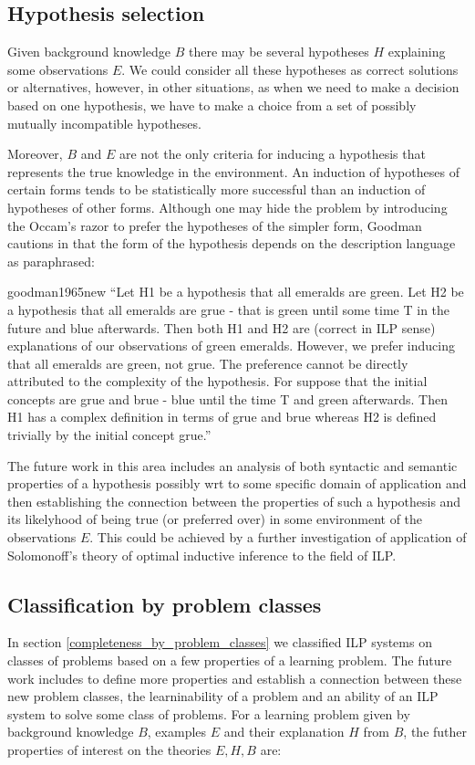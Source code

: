 \subsection{Hypothesis selection}
Given background knowledge $B$ there may be several hypotheses $H$ explaining some observations $E$. We could consider all these hypotheses as correct solutions or alternatives, however, in other situations, as when we need to make a decision based on one hypothesis, we have to make a choice from a set of possibly mutually incompatible hypotheses.

Moreover, $B$ and $E$ are not the only criteria for inducing a hypothesis that represents the true knowledge in the environment.
An induction of hypotheses of certain forms tends to be statistically more successful than an induction of hypotheses of other forms.
Although one may hide the problem by introducing the Occam's razor to prefer the hypotheses of the simpler form, Goodman cautions in \cite{goodman1965new} that the form of the hypothesis depends on the description language as paraphrased:

\begin{cite}{goodman1965new}
``Let H1 be a hypothesis that all emeralds are green. Let H2 be a hypothesis that all emeralds are grue - that is green until some time T in the future and blue afterwards. Then both H1 and H2 are (correct in ILP sense) explanations of our observations of green emeralds. However, we prefer inducing that all emeralds are green, not grue. The preference cannot be directly attributed to the complexity of the hypothesis. For suppose that the initial concepts are grue and brue - blue until the time T and green afterwards. Then H1 has a complex definition in terms of grue and brue whereas H2 is defined trivially by the initial concept grue.''
\end{cite}

The future work in this area includes an analysis of both syntactic and semantic properties of a hypothesis possibly wrt to some specific domain of application and then establishing the connection between the properties of such a hypothesis and its likelyhood of being true (or preferred over) in some environment of the observations $E$. This could be achieved by a further investigation of application of Solomonoff's theory of optimal inductive inference\cite{solomonoff1964formal} to the field of ILP.

\subsection{Classification by problem classes}
In section \ref{completeness_by_problem_classes} we classified ILP systems on classes of problems based on a few properties of a learning problem. The future work includes to define more properties and establish a connection between these new problem classes, the learninability of a problem and an ability of an ILP system to solve some class of problems. For a learning problem given by background knowledge $B$, examples $E$ and their explanation $H$ from $B$, the futher properties of interest on the theories $E, H, B$ are:

